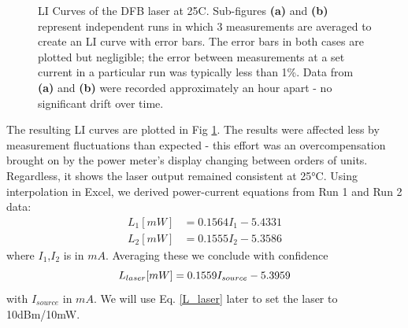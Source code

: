 \documentclass[12pt,a4paper]{report}
\begin{document}
\begin{figure}
    \centering
    \quad
    \caption{LI Curves of the DFB laser at 25\degree{}C. Sub-figures \textbf{(a)} and \textbf{(b)} represent independent runs in which 3 measurements are averaged to create an LI curve with error bars. The error bars in both cases are plotted but negligible; the error between measurements at a set current in a particular run was typically less than 1\%. Data from \textbf{(a)} and \textbf{(b)} were recorded approximately an hour apart - no significant drift over time.}
    \label{fig LI curves}%
    \vspace{-12pt}
\end{figure}

The resulting LI curves are plotted in Fig \ref{fig LI curves}. The results were affected less by measurement fluctuations than expected - this effort was an overcompensation brought on by the power meter's display changing between orders of units. Regardless, it shows the laser output remained consistent at 25°C. Using interpolation in Excel, we derived power-current equations from Run 1 and Run 2 data:
\begin{align*}
    L_1 [mW] &= 0.1564 I_1 - 5.4331 \\
    L_2 [mW] &= 0.1555 I_2 - 5.3586
\end{align*}
where $I_1$,$I_2$ is in $mA$. Averaging these we conclude with confidence
\begin{equation}
    L_{laser} [mW] = 0.1559 I_{source} - 5.3959 \\
    \label{L_laser}
\end{equation}
with $I_{source}$ in $mA$. We will use Eq. \ref{L_laser} later to set the laser to 10dBm/10mW.
\end{document}
